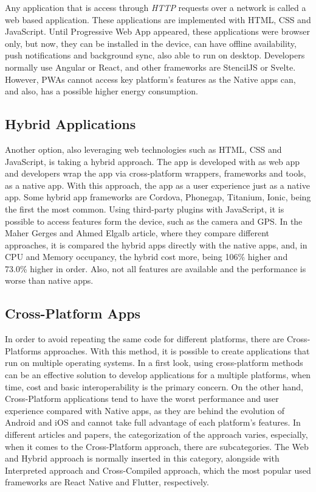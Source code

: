 Any application that is access through \textit{HTTP} requests over a network is called a web based application.
These applications are implemented with HTML, CSS and JavaScript.
Until Progressive Web App appeared, these applications were browser only, but now, they can be installed in the device, can have offline availability, push notifications and background sync, also able to run on desktop.
Developers normally use Angular or React, and other frameworks are StencilJS or Svelte.
However, PWAs cannot access key platform's features as the Native apps can, and also, has a possible higher energy consumption.\cite{Huber2021}


\subsection{Hybrid Applications}\label{subsec:hybrid-applications}

Another option, also leveraging web technologies such as HTML, CSS and JavaScript, is taking a hybrid approach.
The app is developed with as web app and developers wrap the app via cross-platform wrappers, frameworks and tools, as a native app.
With this approach, the app as a user experience just as a native app.
Some hybrid app frameworks are Cordova, Phonegap, Titanium, Ionic, being the first the most common.
Using third-party plugins with JavaScript, it is possible to access features form the device, such as the camera and GPS\@.
In the Maher Gerges and Ahmed Elgalb article\cite{Gerges2024}, where they compare different approaches, it is compared the hybrid apps directly with the native apps, and, in CPU and Memory occupancy, the hybrid cost more, being 106\% higher and 73.0\% higher in order.
Also, not all features are available and the performance is worse than native apps.\cite{Gerges2024}


\subsection{Cross-Platform Apps}\label{subsec:cross-platform-apps}

In order to avoid repeating the same code for different platforms, there are Cross-Platforms approaches.
With this method, it is possible to create applications that run on multiple operating systems.
In a first look, using cross-platform methods can be an effective solution to develop applications for a multiple platforms, when time, cost and basic interoperability is the primary concern.
On the other hand, Cross-Platform applications tend to have the worst performance and user experience compared with Native apps, as they are behind the evolution of Android and iOS and cannot take full advantage of each platform's features\cite{Nagy2022}.
In different articles and papers, the categorization of the approach varies, especially, when it comes to the Cross-Platform approach, there are subcategories\cite{ELKASSAS2017163}.
The Web and Hybrid approach is normally inserted in this category, alongside with Interpreted approach and Cross-Compiled approach\cite{ELKASSAS2017163}, which the most popular used frameworks are React Native and Flutter, respectively.

